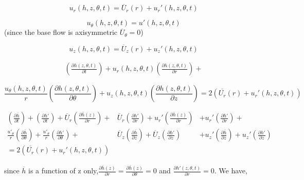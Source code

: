 \documentclass{article}
\begin{document}
\begin{equation}
u_{r}(h,z,\theta,t)=\overline{U}_{r}(r)+u_{r}'(h,z,\theta,t)
\end{equation}

\begin{equation}
u_{\theta}(h,z,\theta,t)=u'(h,z,\theta,t)
\end{equation}
(since the base flow is axisymmetric $\overline{U}_{\theta}=0$)

\begin{equation}
u_{z}(h,z,\theta,t)=\overline{U}_{z}(r)+u_{z}'(h,z,\theta,t)
\end{equation}

\begin{eqnarray*}
\left(\frac{\partial h(z,\theta,t)}{\partial t}\right)+u_{r}(h,z,\theta,t)\left(\frac{\partial h(z,\theta,t)}{\partial r}\right)+
\end{eqnarray*}

\begin{equation}
\frac{u_{\theta}(h,z,\theta,t)}{r}\left(\frac{\partial h(z,\theta,t)}{\partial\theta}\right)+u_{z}(h,z,\theta,t)\left(\frac{\partial h(z,\theta,t)}{\partial z}\right)=2(\overline{U_{r}}(r)+u_{r}'(h,z,\theta,t))
\end{equation}

\begin{eqnarray*}
\left(\frac{\partial\overline{h}}{\partial t}\right)+\left(\frac{\partial h'}{\partial t}\right)+\overline{U}_{r}\left(\frac{\partial\overline{h}(z)}{\partial r}\right)+ & \overline{U}_{r}\left(\frac{\partial h'}{\partial r}\right)+u_{r}'\left(\frac{\partial\overline{h}(z)}{\partial r}\right) & +u_{r}'\left(\frac{\partial h'}{\partial r}\right)+\\
\frac{u'_{\theta}}{r}\left(\frac{\partial\overline{h}}{\partial\theta}\right)+\frac{u'_{\theta}}{r}\left(\frac{\partial h'}{\partial\theta}\right)+ & \overline{U}_{z}\left(\frac{\partial\overline{h}}{\partial z}\right)+\overline{U}_{z}\left(\frac{\partial h'}{\partial z}\right) & +u_{z}'\left(\frac{\partial\overline{h}}{\partial z}\right)+u_{z}'\left(\frac{\partial h'}{\partial z}\right)\\
=2(\overline{U_{r}}(r)+u_{r}'(h,z,\theta,t))
\end{eqnarray*}

since $\overline{h}$ is a function of z only,$\frac{\partial\overline{h}(z)}{\partial r}=\frac{\partial\overline{h}(z)}{\partial\theta}=0$
and $\frac{\partial h'(z,\theta,t)}{\partial r}=0$. We have,
\end{document}
